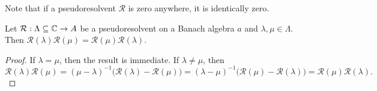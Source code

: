 Note that if a pseudoresolvent $\mathcal{R}$ is zero anywhere, it is identically zero.

\begin{lemma}
Let $\mathcal{R}:\Lambda \subseteq \mathbb{C} \to A$ be a pseudoresolvent on a Banach algebra $a$ and $\lambda,\mu\in\Lambda$. Then $\mathcal{R}(\lambda)\mathcal{R}(\mu) = \mathcal{R}(\mu)\mathcal{R}(\lambda)$.
\end{lemma}
\begin{proof}
If $\lambda = \mu$, then the result is immediate. If $\lambda \neq \mu$, then
\[ \mathcal{R}(\lambda)\mathcal{R}(\mu) = (\mu-\lambda)^{-1}\big(\mathcal{R}(\lambda) - \mathcal{R}(\mu)\big) = (\lambda - \mu)^{-1}\big(\mathcal{R}(\mu) - \mathcal{R}(\lambda)\big) = \mathcal{R}(\mu)\mathcal{R}(\lambda). \]
\end{proof}

